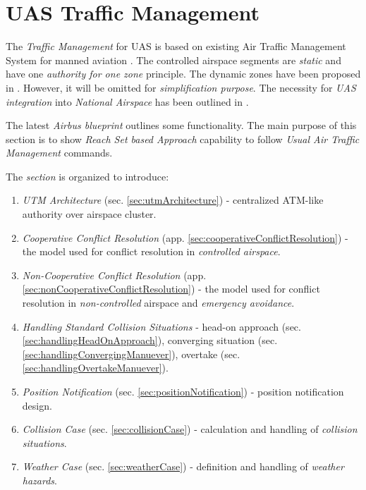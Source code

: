 \cleardoublepage
\section{UAS Traffic Management}\label{sec:UASTrafficManagement}

\noindent The \emph{Traffic Management} for UAS is based on existing Air Traffic Management System for manned aviation \cite{icao4444}. The controlled airspace segments are \emph{static} and have one \emph{authority for one zone} principle. The dynamic zones have been proposed in \cite{gerdes2016dynamic}. However, it will be omitted for \emph{simplification purpose}. The necessity for \emph{UAS integration} into \emph{National Airspace} has been outlined in \cite{spriesterbach2013unmanned}.

The latest \emph{Airbus blueprint} \cite{airbusUTM2018blueprint} outlines some functionality. The main purpose of this section is to show \emph{Reach Set based Approach} capability to follow \emph{Usual Air Traffic Management} commands.

The \emph{section} is organized to introduce:
\begin{enumerate}
    \item \emph{UTM Architecture} (sec. \ref{sec:utmArchitecture}) - centralized ATM-like authority over airspace cluster.
    
    \item \emph{Cooperative Conflict Resolution} (app. \ref{sec:cooperativeConflictResolution}) - the model used for conflict resolution in \emph{controlled airspace}.
    
    \item \emph{Non-Cooperative Conflict Resolution} (app. \ref{sec:nonCooperativeConflictResolution})  - the model used for conflict resolution in \emph{non-controlled} airspace and \emph{emergency avoidance}.
    
    \item \emph{Handling Standard Collision Situations} - head-on approach (sec. \ref{sec:handlingHeadOnApproach}), converging situation (sec. \ref{sec:handlingConvergingManuever}), overtake (sec. \ref{sec:handlingOvertakeManuever}).
    
    \item \emph{Position Notification} (sec. \ref{sec:positionNotification}) - position notification design.
    
    \item \emph{Collision Case} (sec. \ref{sec:collisionCase}) - calculation and handling of \emph{collision situations}.
    
    \item \emph{Weather Case} (sec. \ref{sec:weatherCase}) - definition and handling of \emph{weather hazards}.
\end{enumerate}